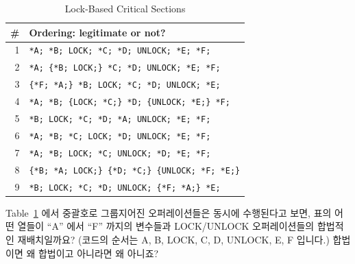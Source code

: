 \begin{enumerate}
\begin{table}[htbp]
\scriptsize\centering
\begin{tabular}{r|l}
  \# & Ordering: legitimate or not? \\
  \hline
  \hline
  1 & \verb|*A; *B; LOCK; *C; *D; UNLOCK; *E; *F;| \\
  \hline
  2 & \verb|*A; {*B; LOCK;} *C; *D; UNLOCK; *E; *F;| \\
  \hline
  3 & \verb|{*F; *A;} *B; LOCK; *C; *D; UNLOCK; *E;| \\
  \hline
  4 & \verb|*A; *B; {LOCK; *C;} *D; {UNLOCK; *E;} *F;| \\
  \hline
  5 & \verb|*B; LOCK; *C; *D; *A; UNLOCK; *E; *F;| \\
  \hline
  6 & \verb|*A; *B; *C; LOCK; *D; UNLOCK; *E; *F;| \\
  \hline
  7 & \verb|*A; *B; LOCK; *C; UNLOCK; *D; *E; *F;| \\
  \hline
  8 & \verb|{*B; *A; LOCK;} {*D; *C;} {UNLOCK; *F; *E;}| \\
  \hline
  9 & \verb|*B; LOCK; *C; *D; UNLOCK; {*F; *A;} *E;| \\
\end{tabular}
\caption{Lock-Based Critical Sections}
\label{tab:advsync:Lock-Based Critical Sections}
\end{table}

\QuickQuiz{}
	Table~\ref{tab:advsync:Lock-Based Critical Sections} 에서 중괄호로
	그룹지어진 오퍼레이션들은 동시에 수행된다고 보면, 표의 어떤 열들이
	``A'' 에서 ``F'' 까지의 변수들과 LOCK/UNLOCK 오퍼레이션들의 합법적인
	재배치일까요?
	(코드의 순서는 A, B, LOCK, C, D, UNLOCK, E, F 입니다.)
	합법이면 왜 합법이고 아니라면 왜 아니죠?
	\iffalse


\end{enumerate}
